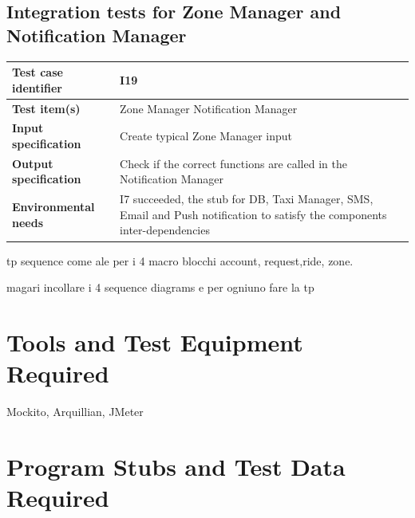 \documentclass[a4paper,11pt]{report} %
\begin{document}
		\subsection{Integration tests for Zone Manager and Notification Manager}
			\begin{minipage}{\linewidth}
			\end{minipage}		
		\begin{center}
			\renewcommand{\arraystretch}{1.2}
			\setlength{\tabcolsep}{24pt}
			\begin{tabular}{ l  p{9cm}}\hline
				\textbf{Test case identifier} & I19\\\hline
				\textbf{Test item(s)} & Zone Manager \textrightarrow Notification Manager\\\hline
				\textbf{Input specification} & Create typical Zone Manager input \\\hline
				\textbf{Output specification} & Check if the correct functions are called in the Notification Manager\\\hline
				\textbf{Environmental needs} &  I7 succeeded, the stub for DB, Taxi Manager, SMS, Email and Push notification to satisfy the components inter-dependencies\\\hline
			\end{tabular}
		\end{center}									
			
	tp sequence come ale per i 4 macro blocchi account, request,ride, zone.
	
	magari incollare i 4 sequence diagrams e per ogniuno fare la tp
	
	\section{Tools and Test Equipment Required}
		Mockito, Arquillian, JMeter
	
	
	\section{Program Stubs and Test Data Required}
	
\end{document}

